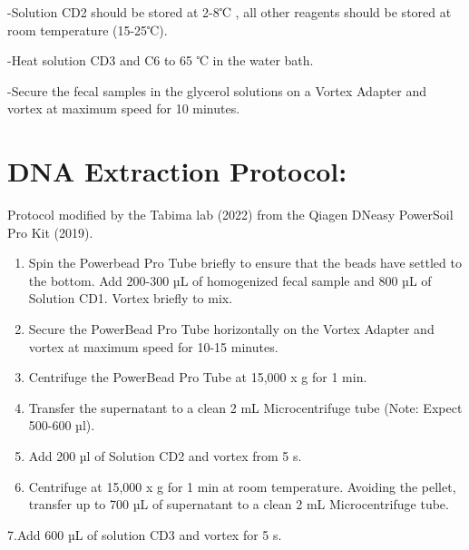 \documentclass[
]{book}
\begin{document}
-Solution CD2 should be stored at 2-8℃ , all other reagents should be stored at room temperature (15-25℃).

-Heat solution CD3 and C6 to 65 ℃ in the water bath.

-Secure the fecal samples in the glycerol solutions on a Vortex Adapter and vortex at maximum speed for 10 minutes.

\hypertarget{dna-extraction-protocol}{%
\section{DNA Extraction Protocol:}\label{dna-extraction-protocol}}

Protocol modified by the Tabima lab (2022) from the Qiagen DNeasy PowerSoil Pro Kit (2019).

\begin{enumerate}
\def\labelenumi{\arabic{enumi}.}
\item
  Spin the Powerbead Pro Tube briefly to ensure that the beads have settled to the bottom. Add 200-300 µL of homogenized fecal sample and 800 µL of Solution CD1. Vortex briefly to mix.
\item
  Secure the PowerBead Pro Tube horizontally on the Vortex Adapter and vortex at maximum speed for 10-15 minutes.
\item
  Centrifuge the PowerBead Pro Tube at 15,000 x g for 1 min.
\item
  Transfer the supernatant to a clean 2 mL Microcentrifuge tube (Note: Expect 500-600 µl).
\item
  Add 200 µl of Solution CD2 and vortex from 5 s.
\item
  Centrifuge at 15,000 x g for 1 min at room temperature. Avoiding the pellet, transfer up to 700 µL of supernatant to a clean 2 mL Microcentrifuge tube.
\end{enumerate}

7.Add 600 µL of solution CD3 and vortex for 5 s.
\end{document}
